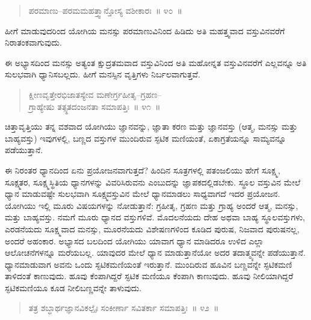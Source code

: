 \vspace{-0.25cm}

\begin{verse}
ಪರಮಾಣು–ಪರಮಮಹತ್ತ್ವಾನ್ತೋಸ್ಯ ವಶೀಕಾರಃ~॥ ೪೦~॥
\end{verse}

\vspace{-0.3cm}

ಹೀಗೆ ಮಾಡುವುದರಿಂದ ಯೋಗಿಯ ಮನಸ್ಸು ಪರಮಾಣುವಿನಿಂದ ಹಿಡಿದು ಅತಿ ಮಹತ್ತ್ವವಾದ ವಸ್ತುವಿನವರೆಗೆ ನಿರಾತಂಕವಾಗುವುದು. 

ಈ ಅಭ್ಯಾಸದಿಂದ ಮನಸ್ಸು ಅತ್ಯಂತ ಕ್ಷುದ್ರತಮವಾದ ವಸ್ತುವಿನಿಂದ ಅತಿ ಮಹೋನ್ನತ ವಸ್ತುವಿನವರೆಗೆ ಎಲ್ಲವನ್ನೂ ಅತಿ ಸುಲಭವಾಗಿ ಧ್ಯಾನಿಸಬಲ್ಲದು. ಹೀಗೆ ಮನಸ್ಸಿನ ವೃತ್ತಿಗಳು ನಿರ್ಬಲವಾಗುತ್ತವೆ. 

\vspace{-0.3cm}

\begin{verse}
ಕ್ಷೀಣವೃತ್ತೇರಭಿಜಾತಸ್ಯೇವ ಮಣೇರ್ಗ್ರಹೀತೃ–ಗ್ರಹಣ–\\ಗ್ರಾಹ್ಯೇಷು ತತ್ಸ್ಥತದಂಜನತಾ ಸಮಾಪತ್ತಿಃ~॥ ೪೧~॥
\end{verse}

\vspace{-0.3cm}

ಚಿತ್ತಾವೃತ್ತಿಯು ತನ್ನ ವಶವಾದ ಯೋಗಿಯು ಜ್ಞಾನವನ್ನು, ಜ್ಞಾತಾ ಕರಣ ಮತ್ತು ಜ್ಞಾನವಸ್ತು (ಆತ್ಮ, ಮನಸ್ಸು ಮತ್ತು ಬಾಹ್ಯವಸ್ತು) ಇವುಗಳಲ್ಲಿ, ಬಣ್ಣದ ವಸ್ತುಗಳ ಮುಂದಿರುವ ಸ್ಫಟಿಕ ಮಣಿಯಂತೆ, ಏಕಾಗ್ರತೆಯನ್ನೂ ಸಾಮ್ಯವನ್ನೂ ಪಡೆಯುತ್ತಾನೆ. 

ಈ ನಿರಂತರ ಧ್ಯಾನದಿಂದ ಏನು ಪ್ರಯೋಜನವಾಗುತ್ತದೆ? ಹಿಂದಿನ ಸೂತ್ರಗಳಲ್ಲಿ ಪತಂಜಲಿಯು ಹೇಗೆ ಸೂಕ್ಷ್ಮ, ಸೂಕ್ಷ್ಮತರ, ಸೂಕ್ಷ್ಮಸ್ಥಿತಿಯ ಧ್ಯಾನಗಳನ್ನು ವಿವರಿಸಿರುವನು ಎಂಬುದನ್ನು ಜ್ಞಾಪಕದಲ್ಲಿಡಬೇಕು. ಸ್ಥೂಲ ವಸ್ತುವಿನ ಮೇಲೆ ಧ್ಯಾನ ಮಾಡುವಷ್ಟೇ ಸುಲಭವಾಗಿ ಸೂಕ್ಷ್ಮವಸ್ತುವಿನ ಮೇಲೆ ಧ್ಯಾನಮಾಡಲು ಸಾಧ್ಯವಾಗದೆ ಇದರ ಪ್ರಯೋಜನ. ಯೋಗಿಯು ಇಲ್ಲಿ ಮೂರು ವಿಷಯಗಳನ್ನು ನೋಡುತ್ತಾನೆ: ಗ್ರಹೀತೃ, ಗ್ರಹಣ ಮತ್ತು ಗ್ರಾಹ್ಯ ಅಂದರೆ ಆತ್ಮ, ಮನಸ್ಸು, ಮತ್ತು ಬಾಹ್ಯವಸ್ತು. ನಮಗೆ ಮೂರು ಧ್ಯಾನದ ವಸ್ತುಗಳಿವೆ. ಮೊದಲನೆಯದು ದೇಹ ಅಥವಾ ಬಾಹ್ಯ ಸ್ಥೂಲವಸ್ತುಗಳು, ಎರಡನೆಯದು ಸೂಕ್ಷ್ಮವಾದ ಮನಸ್ಸು, ಮೂರನೆಯದು ವಿಶೇಷಣಗಳಿಂದ ಕೂಡಿದ ಪುರುಷ, ನಿಜವಾದ ಪುರುಷನಲ್ಲ, ಅಂದರೆ ಅಹಂಕಾರ. ಅಭ್ಯಾಸದ ಬಲದಿಂದ ಯೋಗಿಯು ಯಾವಾಗ ಧ್ಯಾನ ಮಾಡಿದರೂ ಉಳಿದ ಎಲ್ಲಾ ಆಲೋಚನೆಗಳನ್ನೂ ಮರೆಯಬಲ್ಲ. ಯಾವುದರ ಮೇಲೆ ಧ್ಯಾನ ಮಾಡುತ್ತಾನೆಯೋ ಅದರ ತದಾತ್ಮ್ಯವನ್ನೇ ಪಡೆಯುತ್ತಾನೆ. ಧ್ಯಾನಮಾಡುವಾಗ ಅವನು ಒಂದು ಸ್ಫಟಿಕಮಣಿಯಂತೆ ಇರುತ್ತಾನೆ. ಮುಂದಿರುವ ಹೂವಿನ ಬಣ್ಣವನ್ನೇ ಸ್ಫಟಿಕಮಣಿ ತಾಳಿದಂತೆ ಕಾಣುವುದು. ಹೂವು ಕೆಂಪಾಗಿದ್ದರೆ ಸ್ಫಟಿಕ ಮಣಿಯೂ ಕೆಂಪಾಗಿ ಕಾಣುವುದು. ಹೂವು ನೀಲಿಯಾಗಿದ್ದರೆ ಸ್ಫಟಿಕಮಣಿಯೂ ಕೂಡ ನೀಲಿಬಣ್ಣವನ್ನೇ ತಾಳುವುದು. 

\vspace{-0.3cm}

\begin{verse}
ತತ್ರ ಶಬ್ಧಾರ್ಥಜ್ಞಾನವಿಕಲ್ಪೈಃ ಸಂಕೀರ್ಣಾ ಸವಿತರ್ಕಾ ಸಮಾಪತ್ತಿಃ~॥ ೪೨~॥
\end{verse}

